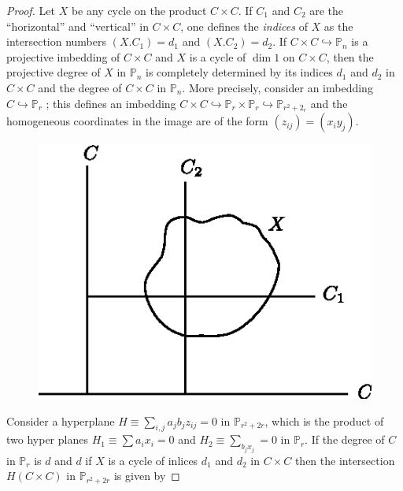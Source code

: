 \begin{proof}%
  Let $X$ be any cycle on the product $C \times C$. If $C_1$ and $C_2$
  are the ``horizontal'' and ``vertical'' in $C \times C$, one defines the
  {\em indices} of $X$ as the intersection numbers $(X.C_1) = d_1 $
  and $(X.C_2) =d_2$. If $C \times C \hookrightarrow \mathbb{P}_n$ is
    a projective imbedding of $C \times C $ and $X$ is a cycle of $\dim 1$
    on $C \times C$, then the projective degree of $X$ in $\mathbb{P}_{
      n}$ is completely determined by its indices $d_1$ and $d_2$ in $C
    \times C$ and the degree of $C \times C$ in $\mathbb{P}_{ n}$. 
    More precisely, consider an imbedding $C \hookrightarrow \mathbb{P}_{
      r}$ ; this defines an imbedding $C \times C \hookrightarrow
  \mathbb{P}_{ r} \times \mathbb{P}_{ r} \hookrightarrow \mathbb{P}_{
    r^2 + 2_r}$ and the homogeneous coordinates in the image are of
  the form $(z_{ ij}) = ( x_ i y_ j)$. 


  \begin{minipage}{5.5cm}
    \begin{figure}[H]
      \centerline{\includegraphics{vol36-figures/fig36-6.eps}}
    \end{figure}
  \end{minipage}\qquad 
  \begin{minipage}{4cm}
  Consider a hyperplane $H\equiv
  \sum\limits_{ i,j}{ a_j b_j z_{ij}}= 0$ in $\mathbb{P}_{ r^2 +
    2r}$, which is the product of two hyper planes $H_1 \equiv \sum 
    a_i x_i =0$ and $H_2 \equiv \sum_{b_j x_j} = 0$ in $\mathbb{P}_{ r}$. If
  the degree of $C$ in $\mathbb{P}_{ r}$ is $d$ and $d$ if $X$ is a cycle
  of inlices $d_1$ and $d_2$ in $C \times C$ then the intersection
  $H(C \times C)$ in $\mathbb{P}_{ r^2 + 2r}$ is given by  
  \end{minipage}
  \bigskip


\end{proof}
